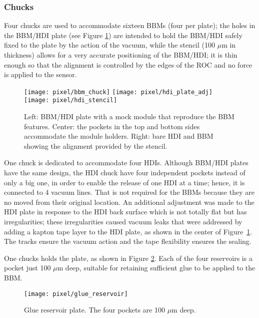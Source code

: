 \subsubsection*{Chucks}

Four chucks are used to accommodate sixteen BBMs (four per plate); the holes in the BBM/HDI plate (see Figure \ref{fig:bbm_hdi_plates}) are intended to hold the BBM/HDI safely fixed to the plate by the action of the vacuum, while the stencil (100 $\mu$m in thickness) allows for a very accurate positioning of the BBM/HDI; it is thin enough so that the alignment is controlled by the edges of the ROC and no force is applied to the sensor.     

\begin{figure}[!h]
  \centering
  \texttt{[image: pixel/bbm\_chuck]}
  \texttt{[image: pixel/hdi\_plate\_adj]}
  \texttt{[image: pixel/hdi\_stencil]}
  \caption[BBM/HDI plate]{Left: BBM/HDI plate with a mock module that reproduce the BBM features. Center: the pockets in the top and bottom sides accommodate the module holders. Right: bare HDI and BBM showing the alignment provided by the stencil.}\label{fig:bbm_hdi_plates}
\end{figure}

One chuck is dedicated to accommodate four HDIs. Although BBM/HDI plates have the same design, the HDI chuck have four independent pockets instead of only a big one, in order to enable the release of one HDI at a time; hence, it is connected to 4 vacuum lines. That is not required for the BBMs because they are no moved from their original location. An additional adjustment was made to the HDI plate in response to the HDI back surface which is not totally flat but has irregularities; these irregularities caused vacuum leaks that were addressed by adding a kapton tape layer to the HDI plate, as shown in the center of Figure~\ref{fig:bbm_hdi_plates}. The tracks ensure the vacuum action and the tape flexibility ensures the sealing.    

One chucks holds the  plate, as shown in Figure \ref{fig:glue_reservoir}. Each of the four reservoirs is a pocket just 100 $\mu$m deep, suitable for retaining sufficient glue to be applied to the BBM.  

\begin{figure}[!h]
  \centering
  \texttt{[image: pixel/glue\_reservoir]}
  \caption[Glue reservoir plate]{Glue reservoir plate. The four pockets are 100 $\mu$m deep. }\label{fig:glue_reservoir}
\end{figure}


